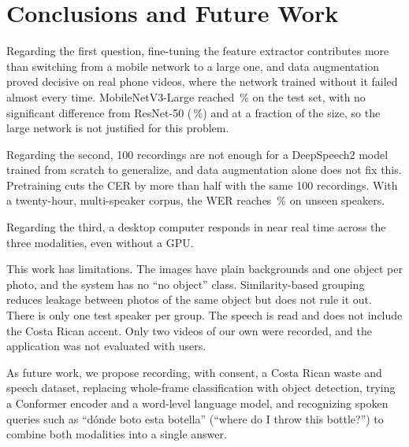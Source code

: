 \section{Conclusions and Future Work}\label{sec:conclusiones}

Regarding the first question, fine-tuning the feature extractor contributes more than switching from a mobile network to a large one, and data augmentation proved decisive on real phone videos, where the network trained without it failed almost every time. MobileNetV3-Large reached \MobAcc\,\% on the test set, with no significant difference from ResNet-50 (\ResAcc\,\%) and at a fraction of the size, so the large network is not justified for this problem.

Regarding the second, 100 recordings are not enough for a DeepSpeech2 model trained from scratch to generalize, and data augmentation alone does not fix this. Pretraining cuts the CER by more than half with the same 100 recordings. With a twenty-hour, multi-speaker corpus, the WER reaches \SlrWer\,\% on unseen speakers.

Regarding the third, a desktop computer responds in near real time across the three modalities, even without a GPU.

This work has limitations. The images have plain backgrounds and one object per photo, and the system has no ``no object'' class. Similarity-based grouping reduces leakage between photos of the same object but does not rule it out. There is only one test speaker per group. The speech is read and does not include the Costa Rican accent. Only two videos of our own were recorded, and the application was not evaluated with users.

As future work, we propose recording, with consent, a Costa Rican waste and speech dataset, replacing whole-frame classification with object detection, trying a Conformer encoder and a word-level language model, and recognizing spoken queries such as ``dónde boto esta botella'' (``where do I throw this bottle?'') to combine both modalities into a single answer.
